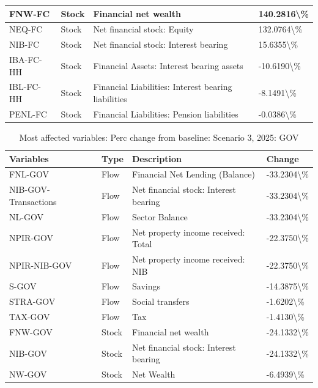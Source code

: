 \documentclass[
]{book}
\begin{document}
\begin{table}
\begin{tabular}[t]{l|l|l|l}
\hline
FNW-FC & Stock & Financial net wealth & 140.2816\textbackslash{}\%\\
\hline
NEQ-FC & Stock & Net financial stock: Equity & 132.0764\textbackslash{}\%\\
\hline
NIB-FC & Stock & Net financial stock: Interest bearing & 15.6355\textbackslash{}\%\\
\hline
IBA-FC-HH & Stock & Financial Assets: Interest bearing assets & -10.6190\textbackslash{}\%\\
\hline
IBL-FC-HH & Stock & Financial Liabilities: Interest bearing liabilities & -8.1491\textbackslash{}\%\\
\hline
PENL-FC & Stock & Financial Liabilities: Pension liabilities & -0.0386\textbackslash{}\%\\
\hline
\end{tabular}
\end{table}

\begin{table}

\caption{\label{tab:most-affected-Scenario-3-perc-GOV-2025}Most affected variables: Perc change from baseline: Scenario 3, 2025: GOV}
\centering
\fontsize{10}{12}\selectfont
\begin{tabular}[t]{l|l|l|l}
\hline
Variables & Type & Description & Change\\
\hline
FNL-GOV & Flow & Financial Net Lending (Balance) & -33.2304\textbackslash{}\%\\
\hline
NIB-GOV-Transactions & Flow & Net financial stock: Interest bearing & -33.2304\textbackslash{}\%\\
\hline
NL-GOV & Flow & Sector Balance & -33.2304\textbackslash{}\%\\
\hline
NPIR-GOV & Flow & Net property income received: Total & -22.3750\textbackslash{}\%\\
\hline
NPIR-NIB-GOV & Flow & Net property income received: NIB & -22.3750\textbackslash{}\%\\
\hline
S-GOV & Flow & Savings & -14.3875\textbackslash{}\%\\
\hline
STRA-GOV & Flow & Social transfers & -1.6202\textbackslash{}\%\\
\hline
TAX-GOV & Flow & Tax & -1.4130\textbackslash{}\%\\
\hline
FNW-GOV & Stock & Financial net wealth & -24.1332\textbackslash{}\%\\
\hline
NIB-GOV & Stock & Net financial stock: Interest bearing & -24.1332\textbackslash{}\%\\
\hline
NW-GOV & Stock & Net Wealth & -6.4939\textbackslash{}\%\\
\hline
\end{tabular}
\end{table}
\end{document}
